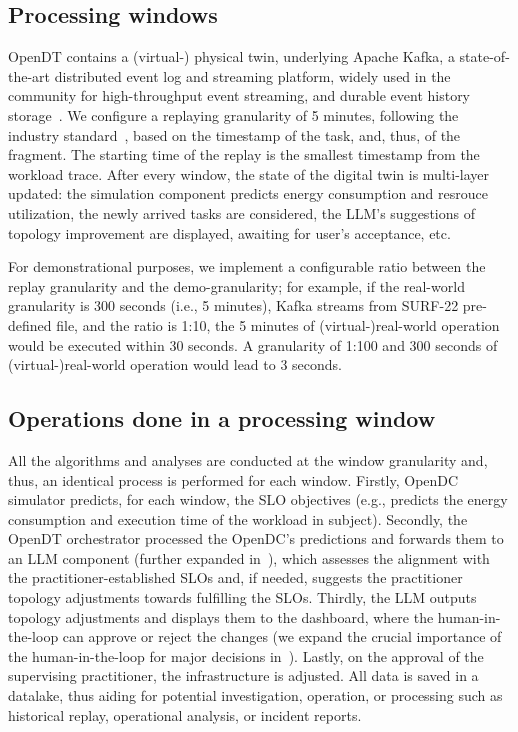 \subsection{Processing windows} \label{sec:processing_windows}
OpenDT contains a (virtual-) physical twin, underlying Apache Kafka, a state-of-the-art distributed event log and streaming platform, widely used in the community for high-throughput event streaming, and durable event history storage~\cite{kafka, kreps2011kafka}. We configure a replaying granularity of 5 minutes, following the industry standard~\cite{DBLP:conf/ccgrid/MastenbroekAJLB21, DBLP:journals/fgcs/MastenbroekMBI25}, based on the timestamp of the task, and, thus, of the fragment. The starting time of the replay is the smallest timestamp from the workload trace. After every window, the state of the digital twin is multi-layer updated: the simulation component predicts energy consumption and resrouce utilization, the newly arrived tasks are considered, the LLM's suggestions of topology improvement are displayed, awaiting for user's acceptance, etc. 

For demonstrational purposes, we implement a configurable ratio between the replay granularity and the demo-granularity; for example, if the real-world granularity is 300 seconds (i.e., 5 minutes), Kafka streams from SURF-22 pre-defined file, and the ratio is 1:10, the 5 minutes of (virtual-)real-world operation would be executed within 30 seconds. A granularity of 1:100 and 300 seconds of (virtual-)real-world operation would lead to 3 seconds. 

\subsection{Operations done in a processing window}
All the algorithms and analyses are conducted at the window granularity and, thus, an identical process is performed for each window. 
Firstly, OpenDC simulator predicts, for each window, the SLO objectives (e.g., predicts the energy consumption and execution time of the workload in subject). 
Secondly, the OpenDT orchestrator processed the OpenDC's predictions and forwards them to an LLM component (further expanded in~), which assesses the alignment with the practitioner-established SLOs and, if needed, suggests the practitioner topology adjustments towards fulfilling the SLOs. 
Thirdly, the LLM outputs topology adjustments and displays them to the dashboard, where the human-in-the-loop can approve or reject the changes (we expand the crucial importance of the human-in-the-loop for major decisions in~).
Lastly, on the approval of the supervising practitioner, the infrastructure is adjusted. 
All data is saved in a datalake, thus aiding for potential investigation, operation, or processing such as historical replay, operational analysis, or incident reports. 



